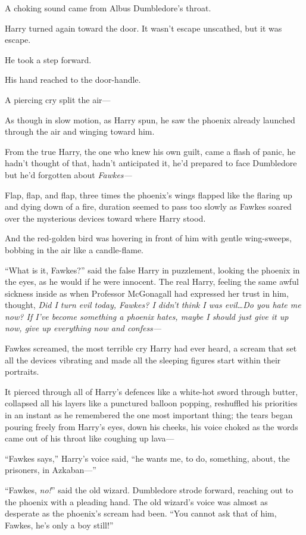 A choking sound came from Albus Dumbledore’s throat.

Harry turned again toward the door. It wasn’t escape unscathed, but it was
escape.

He took a step forward.

His hand reached to the door-handle.

A piercing cry split the air—

As though in slow motion, as Harry spun, he saw the phoenix already launched
through the air and winging toward him.

From the true Harry, the one who knew his own guilt, came a flash of panic, he
hadn’t thought of that, hadn’t anticipated it, he’d prepared to face Dumbledore
but he’d forgotten about \emph{Fawkes—}

Flap, flap, and flap, three times the phoenix’s wings flapped like the flaring
up and dying down of a fire, duration seemed to pass too slowly as Fawkes
soared over the mysterious devices toward where Harry stood.

And the red-golden bird was hovering in front of him with gentle wing-sweeps,
bobbing in the air like a candle-flame.

“What is it, Fawkes?” said the false Harry in puzzlement, looking the phoenix
in the eyes, as he would if he were innocent. The real Harry, feeling the same
awful sickness inside as when Professor McGonagall had expressed her trust in
him, thought, \emph{Did I turn evil today, Fawkes? I didn’t think I was
evil…Do you hate me now? If I’ve become something a phoenix hates,
maybe I should just give it up now, give up everything now and confess—}

Fawkes screamed, the most terrible cry Harry had ever heard, a scream that set
all the devices vibrating and made all the sleeping figures start within their
portraits.

It pierced through all of Harry’s defences like a white-hot sword through
butter, collapsed all his layers like a punctured balloon popping, reshuffled
his priorities in an instant as he remembered the one most important thing; the
tears began pouring freely from Harry’s eyes, down his cheeks, his voice choked
as the words came out of his throat like coughing up lava—

“Fawkes says,” Harry’s voice said, “he wants me, to do, something, about, the
prisoners, in Azkaban—”

“Fawkes, \emph{no!}” said the old wizard. Dumbledore strode forward, reaching
out to the phoenix with a pleading hand. The old wizard’s voice was almost as
desperate as the phoenix’s scream had been. “You cannot ask that of him,
Fawkes, he’s only a boy still!”

